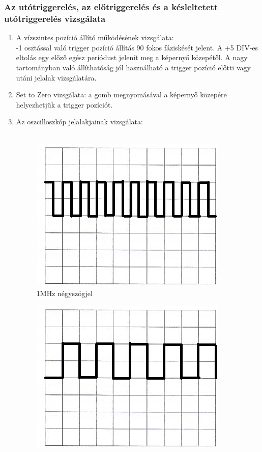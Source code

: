 \documentclass[10pt,a4paper]{article}
\begin{document}
		\subsubsection{Az utótriggerelés, az előtriggerelés és a késleltetett utótriggerelés vizsgálata}
			\begin{enumerate}
				\item A vízszintes pozíció állító működésének vizsgálata:\\
				-1 osztással való trigger pozíció állítás 90 fokos fáziskését jelent.	A +5 DIV-es eltolás egy előző egész periódust jelenít meg a képernyő közepétől. A nagy tartományban való állíthatóság jól használható a trigger pozíció előtti vagy utáni jelalak  vizsgálatára.
				\item Set to Zero vizsgálata: a gomb megnyomásával a képernyő közepére helyezhetjük a trigger pozíciót.
				\item Az oszcilloszkóp jelalakjainak vizsgálata:
				\\\\
				\begin{figure}[hbtp]
				\centering
				\includegraphics[scale=1]{teljes/osc_Qa_1.jpg}
				\caption{1MHz négyszögjel}
				\end{figure}
				\begin{figure}[hbtp]
				\centering
				\includegraphics[scale=1]{teljes/osc_Qa_2.jpg}

\end{figure}
\end{enumerate}
\end{document}
